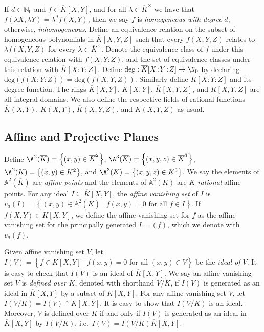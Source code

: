 \documentclass[11pt,letterpaper]{article}
\theoremstyle{definition}
\newcommand{\6}{\mathbf}
\newcommand{\7}{\mathcal}
\begin{document}
If $d \in \mathbb{N}_0$ and $f \in \overline{K}[X,Y]$, and for all $\lambda \in \overline{K}^\times$ we have that $f(\lambda X, \lambda Y) = \lambda^d f(X,Y)$, then we say $f$ is \textit{homogeneous with degree} $d$; otherwise, \textit{inhomogeneous}. Define an equivalence relation on the subset of homogeneous polynomials in $\overline{K}[X,Y,Z]$ such that every $f(X,Y,Z)$ relates to $\lambda f(X, Y, Z)$ for every $\lambda \in \overline{K}^\times$. Denote the equivalence class of $f$ under this equivalence relation with $f(X\!:\!Y\!:\!Z)$, and the set of equivalence classes under this relation with $\overline{K}[X\!:\!Y\!:\!Z]$.
Define $\text{deg}:\overline{K}[X\!:\!Y\!:\!Z] \to \N_0$ by declaring $\text{deg}(f(X\!:\!Y\!:\!Z)) = \text{deg}(f(X,Y,Z))$. Similarly define $K[X\!:\!Y\!:\!Z]$ and its degree function. 
The rings $\overline{K}[X,Y]$, $K[X,Y]$, $\overline{K}[X,Y,Z]$, and $K[X,Y,Z]$ are all integral domains. We also define the respective fields of rational functions $\overline{K}(X,Y)$, $K(X,Y)$, $\overline{K}(X,Y,Z)$, and $K(X,Y,Z)$ as usual.




\subsection{Affine and Projective Planes}

Define $\A^2(\overline{K}) = \left\{(x,y) \in \overline{K}^2\right\}$, $\A^3(\overline{K}) = \left\{(x,y,z) \in \overline{K}^3\right\}$, $\A^2(K) = \left\{(x,y) \in K^2\right\}$, and $\A^3(K)=\left\{(x,y,z) \in K^3\right\}$.  We say the elements of $\mathbb{A}^2(\overline{K})$ are \textit{affine points} and the elements of $\mathbb{A}^2(K)$ are \textit{$K$-rational} affine points. 
For any ideal $I \subseteq \overline{K}[X,Y]$, the \textit{affine vanishing set} of $I$ is  $v_a(I) = \left\{(x,y) \in \mathbb{A}^2(\overline{K}) \mid f(x,y) = 0\text{ for all } f \in I\right\}$. If $f(X,Y) \in \overline{K}[X,Y]$, we define the affine vanishing set for $f$ as the affine vanishing set for the principally generated $I = (f)$, which we denote with $v_a(f)$.


Given affine vanishing set $V$, let $I(V) = \left\{f \in \overline{K}[X,Y] \mid f(x,y) = 0\text{ for all }(x,y) \in V\right\}$  be the \textit{ideal of $V$}. It is easy to check that $I(V)$ is an ideal of $\overline{K}[X,Y]$.
We say an affine vanishing set $V$ is \textit{defined over} $K$, denoted with shorthand $V/K$, if $I(V)$ is generated as an ideal in $\overline{K}[X,Y]$ by a subset of $K[X,Y]$. 
For any affine vanishing set $V$, let $I(V/K) = I(V) \cap K[X,Y]$. It is easy to show that $I(V/K)$ is an ideal. Moreover, $V$ is defined over $K$ if and only if $I(V)$ is generated as an ideal in $\overline{K}[X,Y]$ by $I(V/K)$, i.e.\ $I(V) = I(V/K)\overline{K}[X,Y]$. 
\end{document}
